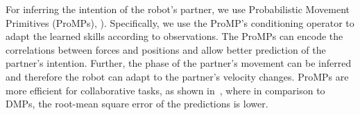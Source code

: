 \documentclass[utf8]{frontiersSCNS} %
\newcommand{\todo}[1]{\textcolor{red}{\textbf{/*#1*/}}}
\begin{document}
\medskip

For inferring the intention of the robot's partner, we use Probabilistic Movement Primitives (ProMPs), \cite{paraschos2013probabilistic}). Specifically, we use the ProMP's conditioning operator to adapt the learned skills according  to observations. The ProMPs can encode the correlations between forces and positions and allow better prediction of the partner's intention.
Further, the phase of the partner's movement can be inferred  and therefore  the robot can adapt to the partner's velocity changes. ProMPs are more efficient for collaborative tasks, as shown in~\cite{maeda2014learning}, where in comparison to DMPs, the root-mean square error of the predictions is lower.



\end{document}
